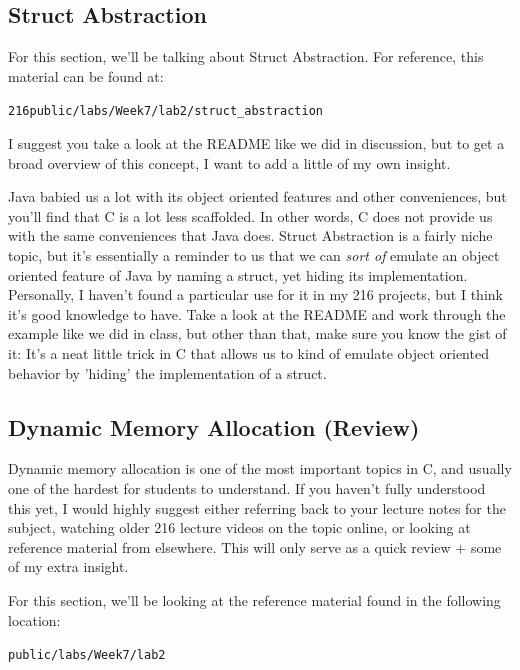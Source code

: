\documentclass[english, 10pt]{article}
\begin{document}
\subsection{Struct Abstraction}

For this section, we'll be talking about Struct Abstraction. For reference, this material can be found at:\newline 

\texttt{216public/labs/Week7/lab2/struct\_abstraction} \newline

I suggest you take a look at the README like we did in discussion, but to get a broad overview of this concept, I want to add a little of my own insight. \newline

Java babied us a lot with its object oriented features and other conveniences, but you'll find that C is a lot less scaffolded. In other words, C does not provide us with the same conveniences that Java does. Struct Abstraction is a fairly niche topic, but it's essentially a reminder to us that we can \textit{sort of} emulate an object oriented feature of Java by naming a struct, yet hiding its implementation. Personally, I haven't found a particular use for it in my 216 projects, but I think it's good knowledge to have. Take a look at the README and work through the example like we did in class, but other than that, make sure you know the gist of it: It's a neat little trick in C that allows us to kind of emulate object oriented behavior by 'hiding' the implementation of a struct.

\subsection{Dynamic Memory Allocation (Review)}

Dynamic memory allocation is one of the most important topics in C, and usually one of the hardest for students to understand. If you haven't fully understood this yet, I would highly suggest either referring back to your lecture notes for the subject, watching older 216 lecture videos on the topic online, or looking at reference material from elsewhere. This will only serve as a quick review + some of my extra insight.\newline

For this section, we'll be looking at the reference material found in the following location:\newline

\texttt{public/labs/Week7/lab2}
\end{document}
